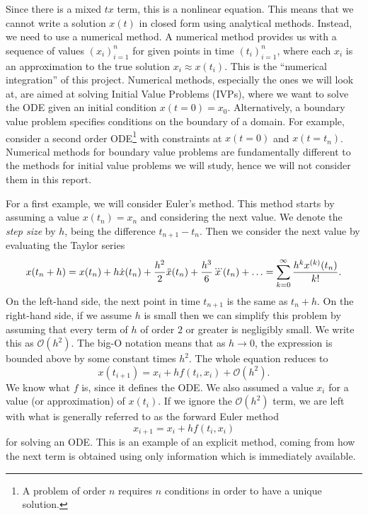 Since there is a mixed $tx$ term, this is a nonlinear equation.
This means that we cannot write a solution $x(t)$ in closed form using analytical methods.
Instead, we need to use a numerical method.
A numerical method provides us with a sequence of values $(x_i)_{i=1}^n$ for given points in time $(t_i)_{i=1}^n$, where each $x_i$ is an approximation to the true solution $x_i \approx x(t_i)$.
This is the ``numerical integration'' of this project.
Numerical methods, especially the ones we will look at, are aimed at solving Initial Value Problems (IVPs), where we want to solve the ODE given an initial condition $x(t=0) = x_0$.
Alternatively, a boundary value problem specifies conditions on the boundary of a domain. For example, consider a second order ODE\footnote{
    A problem of order $n$ requires $n$ conditions in order to have a unique solution.
} with constraints at $x(t=0)$ and $x(t = t_n)$.
Numerical methods for boundary value problems are fundamentally different to the methods for initial value problems we will study, hence we will not consider them in this report.

For a first example, we will consider Euler's method. This method starts by assuming a value $x(t_n) = x_n$ and considering the next value.
We denote the \textit{step size} by $h$, being the difference $t_{n+1} - t_n$.
Then we consider the next value by evaluating the Taylor series
\begin{equation*}
    x(t_n + h) = x(t_n) + h \dot{x}(t_n) + \frac{h^2}{2}\ddot{x}(t_n) + \frac{h^3}{6}\dddot{x}(t_n) + \mathellipsis = \sum_{k=0}^{\infty} \frac{h^k x^{(k)}(t_n)}{k!}.
\end{equation*}
On the left-hand side, the next point in time $t_{n+1}$ is the same as $t_n + h$.
On the right-hand side, if we assume $h$ is small then we can simplify this problem by assuming that every term of $h$ of order $2$ or greater is negligibly small.
We write this as $\mathcal{O}(h^2)$. The big-O notation means that as $h \rightarrow 0$, the expression is bounded above by some constant times $h^2$.
The whole equation reduces to
\begin{equation*}
    x(t_{i+1}) = x_i + hf(t_i, x_i) + \mathcal{O}(h^2).
\end{equation*}
We know what $f$ is, since it defines the ODE. We also assumed a value $x_i$ for a value (or approximation) of $x(t_i)$.
If we ignore the $\mathcal{O}(h^2)$ term, we are left with what is generally referred to as the forward Euler method
\begin{equation}
    x_{i+1} = x_i + h f(t_i, x_i)
\end{equation}
for solving an ODE.
This is an example of an explicit method, coming from how the next term is obtained using only information which is immediately available.

